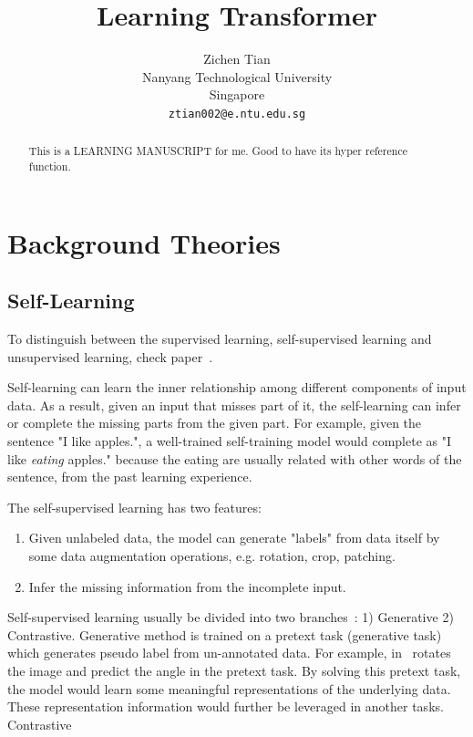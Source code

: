 \documentclass[final]{cvpr}
\begin{document}
\title{Learning Transformer}

\author{Zichen Tian\\
Nanyang Technological University\\
Singapore\\
{\tt\small ztian002@e.ntu.edu.sg}
}

\maketitle


\begin{abstract}
This is a LEARNING MANUSCRIPT for me. Good to have its hyper reference function.
\end{abstract}

\section{Background Theories}

\subsection{Self-Learning }

To distinguish between the supervised learning, self-supervised learning and unsupervised learning, check paper~\cite{liu2020self}.

Self-learning can learn the inner relationship among different components of input data. As a result, given an input that misses part of it, the self-learning can infer or complete the missing parts from the given part. For example, given the sentence "I like \underline{\hspace{0.2in}} apples.", a well-trained self-training model would complete as "I like \textit{eating} apples." because the eating are usually related with other words of the sentence, from the past learning experience.

The self-supervised learning has two features:
\begin{enumerate}
    \item Given unlabeled data, the model can generate "labels" from data itself by some data augmentation operations, e.g. rotation, crop, patching.
    \item Infer the missing information from the incomplete input.
\end{enumerate}

Self-supervised learning usually be divided into two branches~\cite{li2021multi}: 1) Generative 2) Contrastive. Generative method is trained on a pretext task (generative task) which generates pseudo label from un-annotated data. For example, in~\cite{gidaris2018unsupervised} rotates the image and predict the angle in the pretext task. By solving this pretext task, the model would learn some meaningful representations of the underlying data. These representation information would further be leveraged in another tasks. Contrastive 
\end{document}
